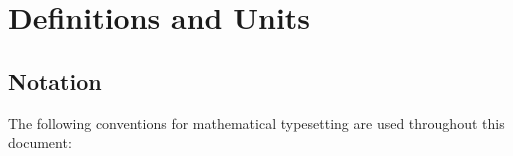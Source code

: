 %
%
%
%
%
%
%

\chapter{Definitions and Units}
\label{ch:defunits}
\section{Notation}
The following conventions for mathematical typesetting 
are used throughout this document:


